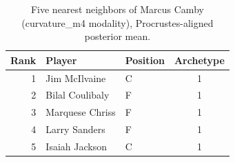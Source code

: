 \begin{table}[htbp]
  \centering\small
  \begin{tabular}{rllc}
    \toprule
    Rank & Player & Position & Archetype \\
    \midrule
    1 & Jim McIlvaine & C & 1 \\
    2 & Bilal Coulibaly & F & 1 \\
    3 & Marquese Chriss & F & 1 \\
    4 & Larry Sanders & F & 1 \\
    5 & Isaiah Jackson & C & 1 \\
    \bottomrule
  \end{tabular}
  \caption{Five nearest neighbors of Marcus Camby (curvature_m4 modality), Procrustes-aligned posterior mean.}
  \label{tab:Marcus_Camby_neighbors_curvature_m4}
\end{table}


